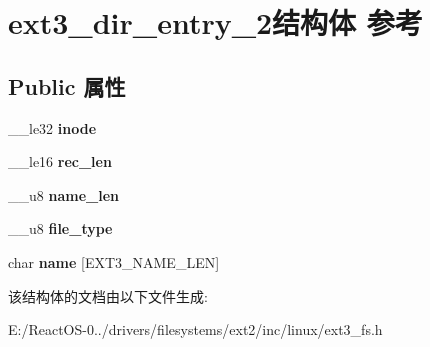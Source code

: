\hypertarget{structext3__dir__entry__2}{}\section{ext3\+\_\+dir\+\_\+entry\+\_\+2结构体 参考}
\label{structext3__dir__entry__2}
\subsection*{Public 属性}
\begin{DoxyCompactItemize}
\item 
\mbox{\label{structext3__dir__entry__2_a4c36fbc929ae1b9ad02a62e20a91f45d}} 
\+\_\+\+\_\+le32 {\bfseries inode}
\item 
\mbox{\label{structext3__dir__entry__2_ac352d6f462d9624df042eb39029f976b}} 
\+\_\+\+\_\+le16 {\bfseries rec\+\_\+len}
\item 
\mbox{\label{structext3__dir__entry__2_a6535d423af2fde96d47ac3dd16cab71e}} 
\+\_\+\+\_\+u8 {\bfseries name\+\_\+len}
\item 
\mbox{\label{structext3__dir__entry__2_ae48d1056f54b88a4a34ee48409bd2248}} 
\+\_\+\+\_\+u8 {\bfseries file\+\_\+type}
\item 
\mbox{\label{structext3__dir__entry__2_a41152276d5996b7bc65e809026f6d95c}} 
char {\bfseries name} \mbox{[}E\+X\+T3\+\_\+\+N\+A\+M\+E\+\_\+\+L\+EN\mbox{]}
\end{DoxyCompactItemize}


该结构体的文档由以下文件生成\+:\begin{DoxyCompactItemize}
\item 
E\+:/\+React\+O\+S-\/0../drivers/filesystems/ext2/inc/linux/ext3\+\_\+fs.\+h\end{DoxyCompactItemize}

